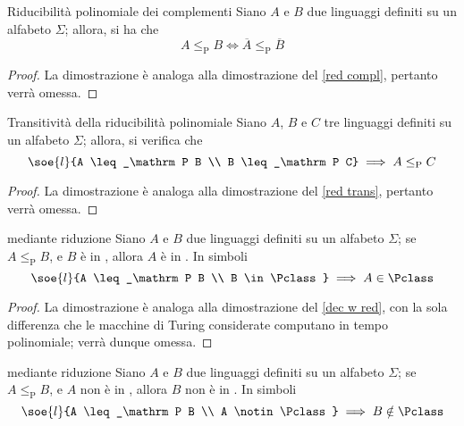 \documentclass[a4paper, 12pt]{report}
\begin{document}
    \begin{framedlem}[label={p red compl}]{Riducibilità polinomiale dei complementi}
        Siano $A$ e $B$ due linguaggi definiti su un alfabeto $\Sigma$; allora, si ha che $$A \leq_\mathrm P B \iff \overline A \leq_\mathrm P \overline B$$
    \end{framedlem}

    \begin{proof}
        La dimostrazione è analoga alla dimostrazione del \cref{red compl}, pertanto verrà omessa.
    \end{proof}

    \begin{framedlem}[label={p red trans}]{Transitività della riducibilità polinomiale}
        Siano $A$, $B$ e $C$ tre linguaggi definiti su un alfabeto $\Sigma$; allora, si verifica che $$\soe{l}{A \leq_\mathrm P B \\ B \leq_\mathrm P C} \implies A \leq_\mathrm P C$$
    \end{framedlem}

    \begin{proof}
        La dimostrazione è analoga alla dimostrazione del \cref{red trans}, pertanto verrà omessa.
    \end{proof}

    \begin{framedthm}[label={p w red}]{\Pclass mediante riduzione}
        Siano $A$ e $B$ due linguaggi definiti su un alfabeto $\Sigma$; se $A \leq_\mathrm P B$, e $B$ è in \Pclass, allora $A$ è in \Pclass. In simboli $$\soe{l}{A \leq_\mathrm P B \\ B \in \Pclass} \implies A \in \Pclass$$
    \end{framedthm}

    \begin{proof}
        La dimostrazione è analoga alla dimostrazione del \cref{dec w red}, con la sola differenza che le macchine di Turing considerate computano in tempo polinomiale; verrà dunque omessa.
    \end{proof}

    \begin{framedcor}[label={p with red cor}]{\Pclass mediante riduzione}
        Siano $A$ e $B$ due linguaggi definiti su un alfabeto $\Sigma$; se $A \leq_\mathrm P B$, e $A$ non è in \Pclass, allora $B$ non è in \Pclass. In simboli $$\soe{l}{A \leq_\mathrm P B \\ A \notin \Pclass} \implies B \notin \Pclass$$
    \end{framedcor}
\end{document}
